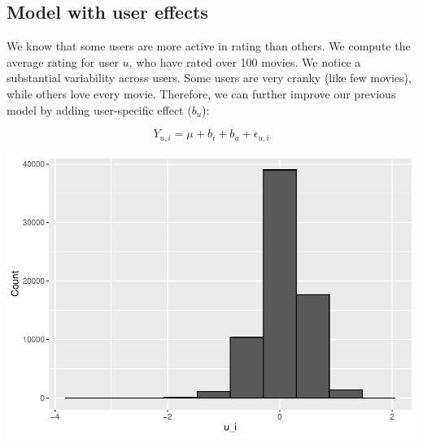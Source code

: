 \documentclass[]{article}
\newenvironment{Shaded}{\begin{snugshade}}{\end{snugshade}}
\newcommand{\CommentTok}[1]{\textcolor[rgb]{0.56,0.35,0.01}{\textit{#1}}}
\newcommand{\DataTypeTok}[1]{\textcolor[rgb]{0.13,0.29,0.53}{#1}}
\newcommand{\DecValTok}[1]{\textcolor[rgb]{0.00,0.00,0.81}{#1}}
\newcommand{\KeywordTok}[1]{\textcolor[rgb]{0.13,0.29,0.53}{\textbf{#1}}}
\newcommand{\NormalTok}[1]{#1}
\newcommand{\OperatorTok}[1]{\textcolor[rgb]{0.81,0.36,0.00}{\textbf{#1}}}
\newcommand{\StringTok}[1]{\textcolor[rgb]{0.31,0.60,0.02}{#1}}
\begin{document}
\subsection{Model with user effects}
\label{sec:uer}

We know that some users are more active in rating than others. We
compute the average rating for user \(u\), who have rated over 100
movies. We notice a substantial variability across users. Some users are
very cranky (like few movies), while others love every movie. Therefore,
we can further improve our previous model by adding user-specific effect
(\(b_{u}\)):

\begin{equation}
Y_{u, i} = \mu + b_{i} + b_{u} + \epsilon_{u, i}
\end{equation}

\begin{Shaded}
\end{Shaded}

\includegraphics{Project_MovieLens_files/figure-latex/unnamed-chunk-26-1.pdf}
\end{document}
